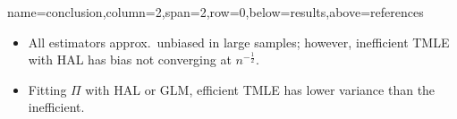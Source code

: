 \documentclass[landscape,a0paper,fontscale=0.285]{baposter} %
\begin{document}
\begin{poster}



{name=conclusion,column=2,span=2,row=0,below=results,above=references}{

\vspace{0.25em}

\begin{multicols}{2}




\begin{itemize}
  \itemsep0pt
  \item All estimators approx.~unbiased in large samples; however, inefficient
    TMLE with HAL has bias not converging at $n^{-\frac{1}{2}}$.
  \item Fitting $\Pi$ with HAL or GLM, efficient TMLE has lower variance than
    the inefficient.\\
\end{itemize}


\end{multicols}}
\end{poster}
\end{document}
